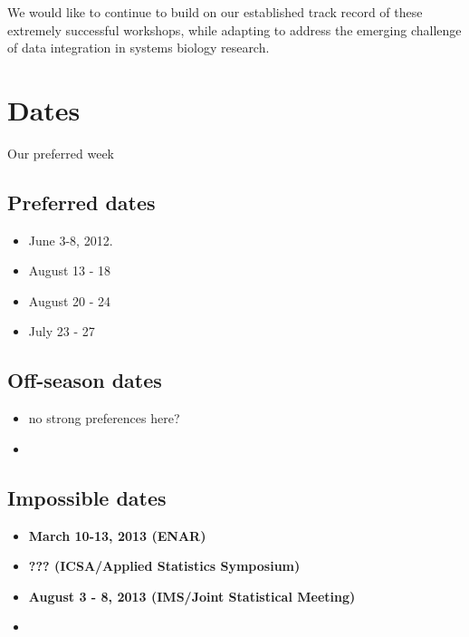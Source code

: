 \documentclass[12pt]{amsart}
\begin{document}
We would like to continue to build on our established track record of
these extremely successful workshops, while adapting to address the
emerging challenge of data integration in systems biology research.

\section*{Dates}

Our preferred week

\subsection*{Preferred dates}
\begin{itemize}
\item June 3-8, 2012.
\item August 13 - 18
\item August 20 - 24
\item July 23 - 27
\end{itemize}

\subsection*{Off-season dates}
\begin{itemize}
\item no strong preferences here?
\item
\end{itemize}


\subsection*{Impossible dates}

\begin{itemize}
\item \textbf{March 10-13, 2013 (ENAR)}
\item \textbf { ???  (ICSA/Applied Statistics Symposium)}
\item \textbf{August 3 - 8, 2013  (IMS/Joint Statistical Meeting)}
\item 
\end{itemize}
\end{document}
